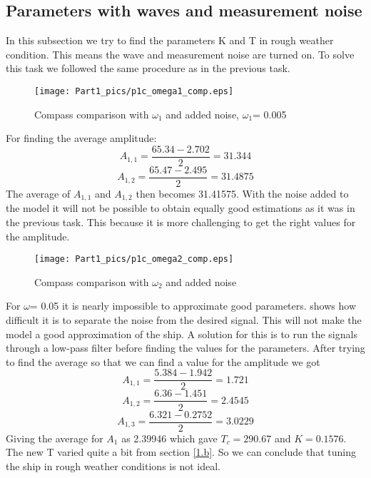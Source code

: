 \subsection{Parameters with waves and measurement noise}
In this subsection we try to find the parameters K and T in rough weather condition. This means the wave and measurement noise are turned on. To solve this task we followed the same procedure as in the previous task.  
\bigskip
\begin{figure}[H]
    \centering
    \texttt{[image: Part1\_pics/p1c\_omega1\_comp.eps]}
    \caption{Compass comparison with $\omega_1$ and added noise, $\omega_1$= 0.005}
    \label{fig:p1c1}
\end{figure}
For finding the average amplitude: 
\begin{equation*}
    A_{1,1} = \frac{65.34 - 2.702}{2} = 31.344
\end{equation*}
\begin{equation*}
    A_{1,2} = \frac{65.47 - 2.495}{2} = 31.4875
\end{equation*}
The average of $A_{1,1}$ and $A_{1,2}$ then becomes 31.41575. With the noise added to the model it will not be possible to obtain equally good estimations as it was in the previous task.  This because it is more challenging to get the right values for the amplitude.
\begin{figure}[H]
    \centering
    \texttt{[image: Part1\_pics/p1c\_omega2\_comp.eps]}
    \caption{Compass comparison with $\omega_2$ and added noise}
    \label{fig:p1c2}
\end{figure}
For $\omega$= 0.05 it is nearly impossible to approximate good parameters.  shows how difficult it is to separate the noise from the desired signal. This will not make the model a good approximation of the ship. 
\newline
A solution for this is to run the signals through a low-pass filter before finding the values for the parameters. After trying to find the average so that we can find a value for the amplitude we got
\begin{equation*}
    A_{1,1} = \frac{5.384 - 1.942}{2} = 1.721
\end{equation*}
\begin{equation*}
    A_{1,2} = \frac{6.36 - 1.451}{2} = 2.4545
\end{equation*}
\begin{equation*}
    A_{1,3} = \frac{6.321 - 0.2752}{2} = 3.0229
\end{equation*}
Giving the average for $A_1$ as 2.39946 which gave $T_c = 290.67$ and $K = 0.1576$. The new T varied quite a bit from section \ref{1.b}. So we can conclude that tuning the ship in rough weather conditions is not ideal.  


